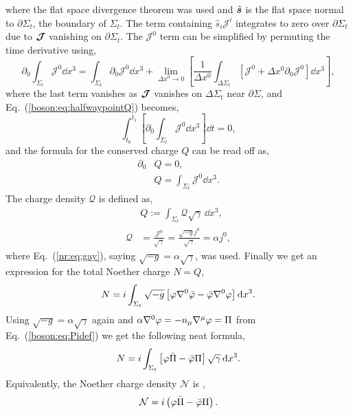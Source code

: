 where the flat space divergence theorem was used and $\hat{\boldsymbol{s}}$ is the flat space normal to $\partial \Sigma_t$, the boundary of $\Sigma_t$. The term containing $\hat{s}_i\mathcal{J}^i$ integrates to zero over $\partial \Sigma_t$ due to $\boldsymbol{\mathcal{J}}$ vanishing on $\partial \Sigma_t$. The $\mathcal{J}^0$ term can be simplified by permuting the time derivative using,
\begin{equation}
\partial_0 \int_{\Sigma_t}\mathcal{J}^0 \dd x^3 = \int_{\Sigma_t}\partial_0 \mathcal{J}^0 \dd x^3 + \lim_{\Delta x^0\rightarrow0}\left[ \frac{1}{\Delta x^0}\int_{\Delta \Sigma_t}\left[ \mathcal{J}^0 +\Delta x^0 \partial_0 \mathcal{J}^0\right] \dd x^3 \right],
\end{equation}
where the last term vanishes as $\boldsymbol{\mathcal{J}}$ vanishes on $\Delta \Sigma_t$ near $\partial\Sigma$, and Eq.~(\ref{boson:eq:halfwaypointQ}) becomes,
\begin{equation}
\int^{t_1}_{t_0}\left[\partial_0 \int_{\Sigma_t} \mathcal{J}^0 \dd x^3 \right]\dd t = 0,
\end{equation}
and the formula for the conserved charge $Q$ can be read off as,
\begin{align}
\partial_0 &Q=0,\\
&Q = \int_{\Sigma_t}\mathcal{J}^0 \dd x^3 .
\end{align}
The charge density $\mathcal{Q}$ is defined as,
\begin{align}
&Q := \int_{\Sigma_t} \mathcal{Q}\sqrt{\gamma} \,\dd x^3 ,\\
\mathcal{Q}&= \frac{\mathcal{J}^0}{\sqrt{\gamma}} = \frac{\sqrt{-g}j^0}{\sqrt{\gamma}} = \alpha j^0,
\end{align}
where Eq.~(\ref{nr:eq:gay}), saying $\sqrt{-g}=\alpha\sqrt{\gamma}$, was used.
Finally we get an expression for the total Noether charge $N=Q$,
\begin{equation}
N =i \int_{\Sigma_t} \sqrt{-g}\left[ \varphi \nabla^0 \bar{\varphi} - \bar{\varphi}\nabla^0 \varphi\right] \dd x^3.
\end{equation}
Using $\sqrt{-g} = \alpha \sqrt{\gamma}$ again and $\alpha \nabla^0 \varphi = -n_\mu \nabla^\mu \varphi = \Pi$ from Eq.~(\ref{boson:eq:Pidef}) we get the following neat formula,
\begin{equation}
N = i\int_{\Sigma_t}\left[ \varphi \bar{\Pi}-\bar{\varphi}\Pi\right] \sqrt{\gamma}\,\dd x^3.
\end{equation}
Equivalently, the Noether charge density $\mathcal{N}$ is ,
\begin{equation}
\mathcal{N} = i\left( \varphi \bar{\Pi}-\bar{\varphi}\Pi\right) .
\end{equation}

